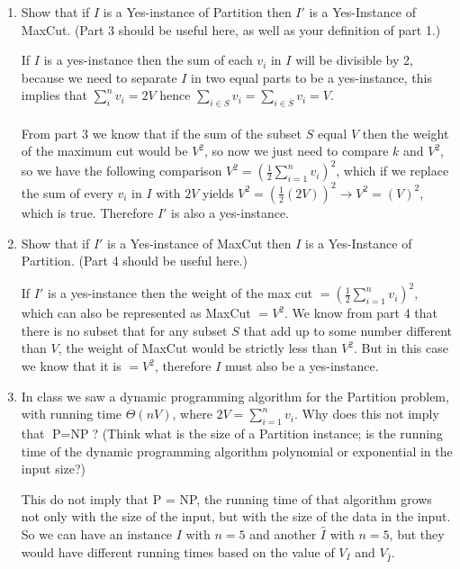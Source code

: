\documentclass[11pt]{article}
\def\question#1{\red{#1}}
\def\soln#1{\par\blu{#1}} %
\def\blu#1{{\color{blu}#1}}
\def\red#1{{\color{red}#1}}
\begin{document}
\begin{enumerate}
\item \question{Show that if $I$ is a Yes-instance of Partition then $I'$ is a
Yes-Instance of MaxCut.} (Part 3 should be useful here, as well as
your definition of part 1.)
\soln{
   If $I$ is a yes-instance then the sum of each $v_i$ in $I$ will be divisible by 2, because we need 
   to separate $I$ in two equal parts to be a yes-instance, this implies that $\sum_{i}^n v_i = 2V$ 
   hence  $\sum_{i\in S} v_i = \sum_{i\in \overline{S}} v_i = V$. \\ \\
   From part 3 we know that if the sum of the subset $S$ equal $V$ then the weight of the maximum 
   cut would be $V^2$, so now we just need to compare $k$ and $V^2$, so we have the following 
   comparison $V^2 = ( \frac{1}{2} \sum_{i=1}^n v_i)^2$, which if we replace the sum of every $v_i$ in $I$
   with $2V$ yields $V^2 = ( \frac{1}{2} (2V))^2 \rightarrow V^2 = (V)^2$, which is true. Therefore 
   $I'$ is also a yes-instance.
}

\item \question{Show that if $I'$ is a Yes-instance of MaxCut then $I$ is a Yes-Instance of Partition.}
(Part 4 should be useful here.)
\soln{
   If $I'$ is a yes-instance then the weight of the max cut $ = ( \frac{1}{2} \sum_{i=1}^n v_i)^2$, 
   which can also be represented as MaxCut $ = V^2$. We know from part 4 that there is no subset 
   that for any subset $S$ that add up to some number different than $V$, the weight of MaxCut would 
   be strictly less than $V^2$. But in this case we know that it is $ = V^2$, therefore $I$ must 
   also be a yes-instance.
}

\item In class we saw a dynamic programming algorithm for the Partition
problem, with running time $\Theta(nV)$, where $2V = \sum_{i=1}^n v_i$.
\question{Why does this not imply that $\text{P}=\text{NP}$?} (Think what is
the size of a Partition instance; is the running time of the dynamic
programming algorithm polynomial or exponential in the input size?)
\soln{
   This do not imply that P = NP, the running time of that algorithm grows not only with the size of 
   the input, but with the size of the data in the input. So we can have an instance $I$ with $n=5$ 
   and another $\hat{I}$ with $n=5$, but they would have different running times based on the value 
   of $V_I$ and $V_{\hat{I}}$.
}


\end{enumerate}
\end{document}
